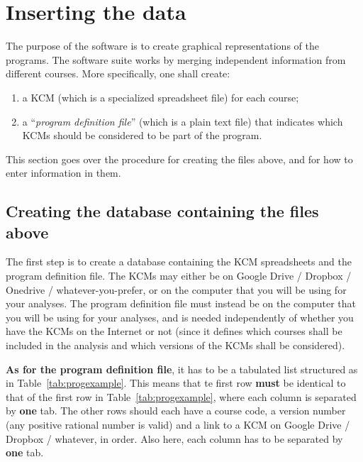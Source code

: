 \section{Inserting the data}
\label{sec:inserting_the_data}

The purpose of the software is to create graphical representations of the programs. The software suite works by merging independent information from different courses. More specifically, one shall create:
%
\begin{enumerate}
	\item a \ac{KCM} (which is a specialized spreadsheet file) for each course;
	\item a ``\emph{program definition file}'' (which is a plain text file) that indicates which \acp{KCM} should be considered to be part of the program.
\end{enumerate}
%
This section goes over the procedure for creating the files above, and for how to enter information in them.

\subsection{Creating the database containing the files above}
\label{creating_the_database}


The first step is to create a database containing the \ac{KCM} spreadsheets and the program definition file. The \acp{KCM} may either be on Google Drive / Dropbox / Onedrive / whatever-you-prefer, or on the computer that you will be using for your analyses. The program definition file must instead be on the computer that you will be using for your analyses, and is needed independently of whether you have the \acp{KCM} on the Internet or not (since it defines which courses shall be included in the analysis and which versions of the \acp{KCM} shall be considered). 

\textbf{As for the program definition file}, it has to be a tabulated list structured as in Table~\ref{tab:progexample}. This means that te first row \textbf{must} be identical to that of the first row in Table~\ref{tab:progexample}, where each column is separated by \textbf{one} tab. The other rows should each have a course code, a version number (any positive rational number is valid) and a link to a \ac{KCM} on Google Drive / Dropbox / whatever, in order. Also here, each column has to be separated by \textbf{one} tab. 

